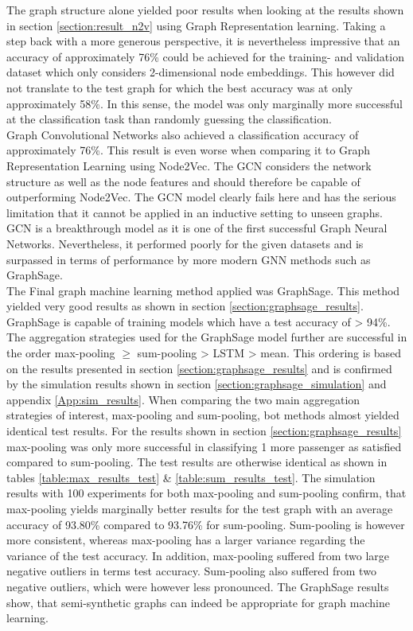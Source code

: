   \noindent The graph structure alone yielded poor results when looking at the 
  results shown in section \ref{section:result_n2v} using Graph Representation 
  learning. Taking a step back with a more generous perspective, it is 
  nevertheless impressive that an accuracy of approximately 76\% could be 
  achieved for the training- and validation dataset which only considers 
  2-dimensional node embeddings. This however did not translate to the test 
  graph for which the best accuracy was at only approximately 58\%. In this 
  sense, the model was only marginally more successful at the classification 
  task than randomly guessing the classification. \\

  \noindent Graph Convolutional Networks also achieved a classification 
  accuracy of approximately 76\%. This result is even worse when comparing it
  to Graph Representation Learning using Node2Vec. The GCN considers the
  network structure as well as the node features and should therefore be
  capable of outperforming Node2Vec. The GCN model clearly fails here and has
  the serious limitation that it cannot be applied in an inductive setting to
  unseen graphs. GCN is a breakthrough model as it is one of the first
  successful Graph Neural Networks. Nevertheless, it performed poorly for the
  given datasets and is surpassed in terms of performance by more modern GNN
  methods such as GraphSage. \\

  \noindent The Final graph machine learning method applied was GraphSage. This
  method yielded very good results as shown in section
  \ref{section:graphsage_results}. GraphSage is capable of training models
  which have a test accuracy of > 94\%. The aggregation strategies used for the
  GraphSage model further are successful in the order max-pooling $\geqslant$ 
  sum-pooling > LSTM > mean. This ordering is based on the results presented in 
  section \ref{section:graphsage_results} and is confirmed by the simulation 
  results shown in section \ref{section:graphsage_simulation} and appendix
  \ref{App:sim_results}. 
  When comparing the two main aggregation strategies of interest, max-pooling 
  and sum-pooling, bot methods almost yielded identical test results. For the
  results shown in section \ref{section:graphsage_results} max-pooling was only 
  more successful in classifying 1 more passenger as satisfied compared to
  sum-pooling. The test results are otherwise identical as shown in tables 
  \ref{table:max_results_test} \& \ref{table:sum_results_test}. The simulation
  results with 100 experiments for both max-pooling and sum-pooling confirm,
  that max-pooling yields marginally better results for the test graph with an
  average accuracy of 93.80\% compared to 93.76\% for sum-pooling. Sum-pooling
  is however more consistent, whereas max-pooling has a larger variance
  regarding the variance of the test accuracy. In addition, max-pooling
  suffered from two large negative outliers in terms test accuracy. Sum-pooling
  also suffered from two negative outliers, which were however less pronounced.
  The GraphSage results show, that semi-synthetic graphs can indeed be
  appropriate for graph machine learning.

